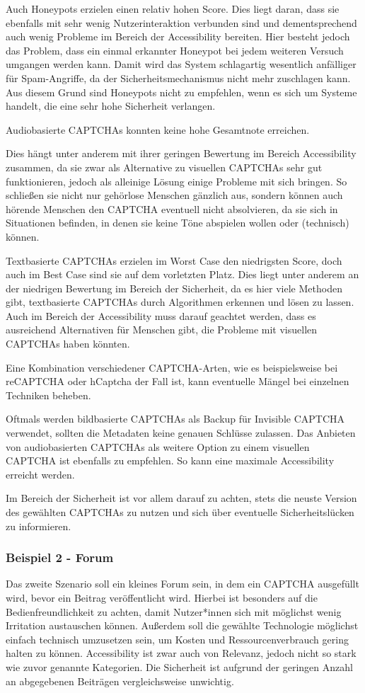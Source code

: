Auch Honeypots erzielen einen relativ hohen Score.
Dies liegt daran, dass sie ebenfalls mit sehr wenig Nutzerinteraktion verbunden sind
und dementsprechend auch wenig Probleme im Bereich der Accessibility bereiten.
Hier besteht jedoch das Problem, dass ein einmal erkannter Honeypot bei jedem weiteren Versuch umgangen werden kann.
Damit wird das System schlagartig wesentlich anfälliger für Spam-Angriffe, da der Sicherheitsmechanismus nicht mehr zuschlagen kann.
Aus diesem Grund sind Honeypots nicht zu empfehlen, wenn es sich um Systeme handelt, die eine sehr hohe Sicherheit verlangen.

Audiobasierte CAPTCHAs konnten keine hohe Gesamtnote erreichen.

Dies hängt unter anderem mit ihrer geringen Bewertung im Bereich Accessibility zusammen,
da sie zwar als Alternative zu visuellen CAPTCHAs sehr gut funktionieren, jedoch als alleinige Lösung einige Probleme mit sich bringen.
So schließen sie nicht nur gehörlose Menschen gänzlich aus, sondern können auch hörende Menschen den CAPTCHA eventuell nicht absolvieren,
da sie sich in Situationen befinden, in denen sie keine Töne abspielen wollen oder (technisch) können.

Textbasierte CAPTCHAs erzielen im Worst Case den niedrigsten Score, doch auch im Best Case sind sie auf dem vorletzten Platz.
Dies liegt unter anderem an der niedrigen Bewertung im Bereich der Sicherheit, 
da es hier viele Methoden gibt, textbasierte CAPTCHAs durch Algorithmen erkennen und lösen zu lassen.
Auch im Bereich der Accessibility muss darauf geachtet werden, dass es ausreichend Alternativen für Menschen gibt,
die Probleme mit visuellen CAPTCHAs haben könnten.

Eine Kombination verschiedener CAPTCHA-Arten, wie es beispielsweise bei reCAPTCHA oder hCaptcha der Fall ist, 
kann eventuelle Mängel bei einzelnen Techniken beheben.

Oftmals werden bildbasierte CAPTCHAs als Backup für Invisible CAPTCHA verwendet, sollten die Metadaten keine genauen Schlüsse zulassen.
Das Anbieten von audiobasierten CAPTCHAs als weitere Option zu einem visuellen CAPTCHA ist ebenfalls zu empfehlen.
So kann eine maximale Accessibility erreicht werden.

Im Bereich der Sicherheit ist vor allem darauf zu achten, stets die neuste Version des gewählten CAPTCHAs zu nutzen 
und sich über eventuelle Sicherheitslücken zu informieren.

\subsubsection*{Beispiel 2 - Forum}
Das zweite Szenario soll ein kleines Forum sein, in dem ein CAPTCHA ausgefüllt wird, bevor ein Beitrag veröffentlicht wird.
Hierbei ist besonders auf die Bedienfreundlichkeit zu achten, damit Nutzer*innen sich mit möglichst wenig Irritation austauschen können.
Außerdem soll die gewählte Technologie möglichst einfach technisch umzusetzen sein, um Kosten und Ressourcenverbrauch gering halten zu können.
Accessibility ist zwar auch von Relevanz, jedoch nicht so stark wie zuvor genannte Kategorien.
Die Sicherheit ist aufgrund der geringen Anzahl an abgegebenen Beiträgen vergleichsweise unwichtig.

